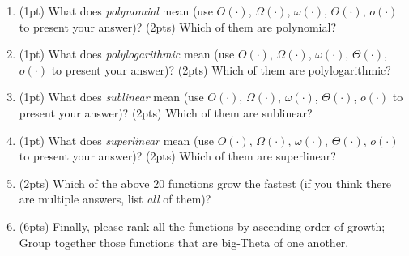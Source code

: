 \documentclass{article}[12pt]
\begin{document}
\begin{enumerate}[label=(\arabic*)]
  \item (1pt) What does \emph{polynomial} mean (use $O(\cdot)$, $\Omega(\cdot)$, $\omega(\cdot)$, $\Theta(\cdot)$, $o(\cdot)$ to present your answer)? (2pts) Which of them are polynomial?

  \item (1pt) What does \emph{polylogarithmic} mean (use $O(\cdot)$, $\Omega(\cdot)$, $\omega(\cdot)$, $\Theta(\cdot)$, $o(\cdot)$ to present your answer)? (2pts) Which of them are polylogarithmic?

  \item (1pt) What does \emph{sublinear} mean (use $O(\cdot)$, $\Omega(\cdot)$, $\omega(\cdot)$, $\Theta(\cdot)$, $o(\cdot)$ to present your answer)? (2pts) Which of them are sublinear?

  \item (1pt) What does \emph{superlinear} mean (use $O(\cdot)$, $\Omega(\cdot)$, $\omega(\cdot)$, $\Theta(\cdot)$, $o(\cdot)$ to present your answer)? (2pts) Which of them are superlinear?

  \item (2pts) Which of the above 20 functions grow the fastest (if you think there are multiple answers, list \emph{all} of them)?

  \item (6pts) Finally, please rank all the functions by ascending order of growth; Group together those functions that are big-Theta of one another.

\end{enumerate}
\end{document}
